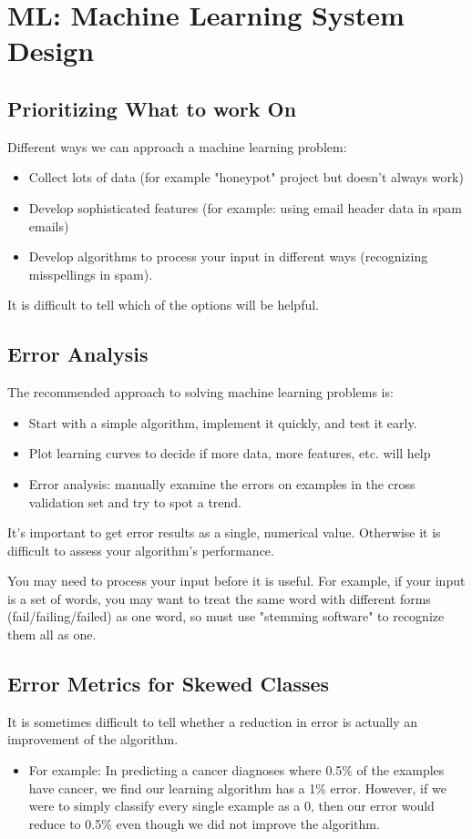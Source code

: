 \section{ML: Machine Learning System Design}
\subsection{Prioritizing What to work On}
Different ways we can approach a machine learning problem:
\begin{itemize}
\item Collect lots of data (for example "honeypot" project but doesn't always work)
\item Develop sophisticated features (for example: using email header data in spam emails)
\item Develop algorithms to process your input in different ways (recognizing misspellings in spam).
\end{itemize}

It is difficult to tell which of the options will be helpful.
\subsection{Error Analysis}
The recommended approach to solving machine learning problems is:
\begin{itemize}
\item Start with a simple algorithm, implement it quickly, and test it early.
\item Plot learning curves to decide if more data, more features, etc. will help
\item Error analysis: manually examine the errors on examples in the cross validation set and try to spot a trend.
\end{itemize}
It's important to get error results as a single, numerical value. Otherwise it is difficult to assess your algorithm's performance.

You may need to process your input before it is useful. For example, if your input is a set of words, you may want to treat the same word with different forms (fail/failing/failed) as one word, so must use "stemming software" to recognize them all as one.
\subsection{Error Metrics for Skewed Classes}
It is sometimes difficult to tell whether a reduction in error is actually an improvement of the algorithm.
\begin{itemize}
\item For example: In predicting a cancer diagnoses where 0.5\% of the examples have cancer, we find our learning algorithm has a 1\% error. However, if we were to simply classify every single example as a 0, then our error would reduce to 0.5\% even though we did not improve the algorithm.
\end{itemize}

